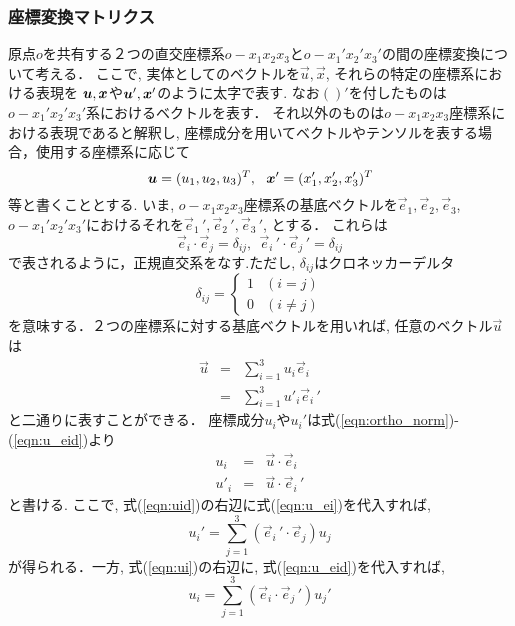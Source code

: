 \documentclass[10pt,a4j]{jarticle}
\begin{document}
\subsubsection{座標変換マトリクス}
原点$o$を共有する２つの直交座標系$o-x_1x_2x_3$と$o-x_1'x_2'x_3'$の間の座標変換について考える．
ここで, 実体としてのベクトルを$\vec{u},\vec{x}$, それらの特定の座標系における表現を
$\mbox{\boldmath $u$},\mbox{\boldmath $x$}$や$\mbox{\boldmath $u$}',\mbox{\boldmath $x$}'$のように太字で表す. 
なお$()'$を付したものは$o-x_1'x_2'x_3'$系におけるベクトルを表す．
それ以外のものは$o-x_1x_2x_3$座標系における表現であると解釈し, 
座標成分を用いてベクトルやテンソルを表する場合，使用する座標系に応じて
\[
	\fat{u}=(u_1, u_2, u_3)^T, \ \ \fat{x}'=(x_1', x_2', x_3')^T
\]
等と書くこととする.
いま, $o-x_1x_2x_3$座標系の基底ベクトルを$\vec{e}_1, \vec{e}_2, \vec{e}_3$, 
$o-x_1'x_2'x_3'$におけるそれを$\vec{e}_1\,', \vec{e}_2\,', \vec{e}_3 \,'$, 
とする． これらは
\begin{equation}
	\vec{e}_i\cdot \vec{e}_j=\delta_{ij}, \ \ 
	\vec{e}_i\,' \cdot \vec{e}_j\,'=\delta_{ij}
	\label{eqn:ortho_norm}
\end{equation}
で表されるように，正規直交系をなす.ただし, $\delta_{ij}$はクロネッカーデルタ
\begin{equation}
	\delta _{ij}=\left\{
	\begin{array}{cc}
		1 & (i=j) \\
		0 & (i\neq j)
	\end{array}
	\right.
	\label{eqn:dij}
\end{equation}
を意味する．２つの座標系に対する基底ベクトルを用いれば, 任意のベクトル$\vec{u}$は
\begin{eqnarray}
	\vec{u} &=& \sum_{i=1}^3 u_i\vec{e}_i 
	\label{eqn:u_ei}
	\\
	&=& \sum_{i=1}^3 u'_i\vec{e}_i\,' 
	\label{eqn:u_eid}
\end{eqnarray}
と二通りに表すことができる． 座標成分$u_i$や$u_i'$は式(\ref{eqn:ortho_norm})-(\ref{eqn:u_eid})より
\begin{eqnarray}
	u_i &=& \vec{u}\cdot \vec{e}_i \label{eqn:ui}\\
	u'_i&=& \vec{u}\cdot \vec{e}_i\,' \label{eqn:uid}
\end{eqnarray}
と書ける. ここで, 式(\ref{eqn:uid})の右辺に式(\ref{eqn:u_ei})を代入すれば, 
\begin{equation}
	u_i'=\sum_{j=1}^3 (\vec{e}_i\,'\cdot \vec{e}_j) u_j 
\end{equation}
が得られる．一方, 式(\ref{eqn:ui})の右辺に, 式(\ref{eqn:u_eid})を代入すれば, 
\begin{equation}
	u_i=\sum_{j=1}^3 (\vec{e}_i\cdot \vec{e}_j\, ') u_j' 
\end{equation}
\end{document}
